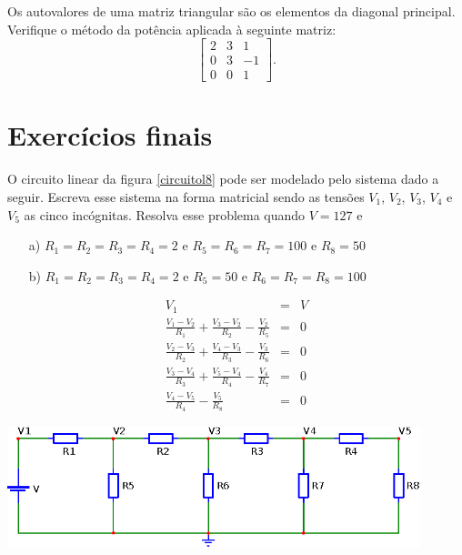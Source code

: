 \begin{exer}Os autovalores de uma matriz triangular são os elementos da diagonal principal. Verifique o método da potência aplicada à seguinte matriz:
$$
\left[\begin{array}{ccc}
2&3&1\\
0&3&-1\\
0&0&1
\end{array}\right].
$$
\end{exer}

\section{Exercícios finais}

\begin{exer}\label{prob_circuito_resistores}
O circuito linear da figura \ref{circuitol8} pode ser modelado pelo sistema dado a seguir. Escreva esse sistema na forma matricial sendo as tensões $V_1$, $V_2$, $V_3$, $V_4$ e $V_5$ as cinco incógnitas. Resolva esse problema quando $V=127$ e
\begin{itemize}
\item[a)] $R_1=R_2=R_3=R_4=2$ e $R_5=R_6=R_7=100$ e $R_8=50$
\item[b)] $R_1=R_2=R_3=R_4=2$ e $R_5=50$ e $R_6=R_7=R_8=100$
\end{itemize}

\begin{eqnarray*}
V_1&=&V\\
\frac{V_1-V_2}{R_1}+\frac{V_3-V_2}{R_2}-\frac{V_2}{R_5}&=&0\\
\frac{V_2-V_3}{R_2}+\frac{V_4-V_3}{R_3}-\frac{V_3}{R_6}&=&0\\
\frac{V_3-V_4}{R_3}+\frac{V_5-V_4}{R_4}-\frac{V_4}{R_7}&=&0\\
\frac{V_4-V_5}{R_4}-\frac{V_5}{R_8}&=&0
\end{eqnarray*}

\begin{center}
\includegraphics[width=12cm,angle=0]{./cap_linsis/pics/circuito_linear_8.eps}\label{circuitol8}
\end{center}


\end{exer}
